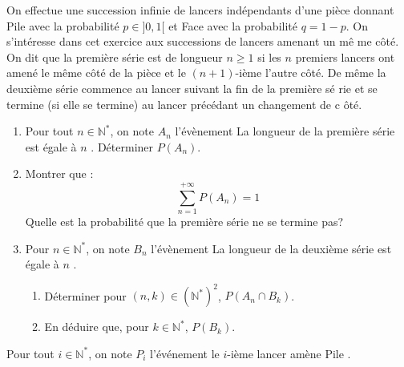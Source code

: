 \documentclass[a4paper,10pt]{report}
\begin{document}
\begin{Exercice}{} On effectue une succession infinie de lancers indépendants d'une pièce
donnant Pile avec la probabilité $p\in ]0,1[$ et Face avec la probabilité $%
q=1-p$.\newline
On s'intéresse dans cet exercice aux successions de lancers amenant un mê%
me côté.\newline
On dit que la première série est de longueur $n\geq 1$ si les $n$
premiers lancers ont amené le même côté de la pièce et le $(n+1)$-ième
l'autre côté.\newline
De même la deuxième série commence au lancer suivant la fin de la première sé%
rie et se termine (si elle se termine) au lancer précédant un changement de c%
ôté.\newline


\begin{enumerate}
\item Pour tout $n \in \mathbb{N}^*$, on note $A_n$ l'évènement \og La longueur de la première série est égale à $n$ \fg. Déterminer $P(A_n)$.
\item Montrer que :
\[\sum\limits_{n=1}^{+\infty }P(A_n)=1\]
Quelle est la probabilité que la première série ne se termine pas?

\item Pour $n \in \mathbb{N}^*$, on note $B_n$ l'évènement \og La longueur de la deuxième série est égale à $n$ \fg .

\begin{enumerate}
\item Déterminer pour $(n,k) \in (\mathbb{N}^*)^2$, $P(A_n \cap B_k)$.

\item En déduire que, pour $k\in \mathbb{N}^{* }$, $P(B_k)$.
\end{enumerate}
\end{enumerate}
\end{Exercice}

\corr Pour tout $i\in \mathbb{N}^{* }$, on note $P_{i}$ l'événement \og le $i$-ième lancer amène Pile \fg.
\end{document}
